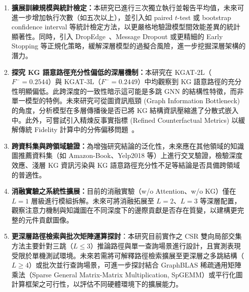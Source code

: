 \begin{enumerate}[leftmargin=2em]
  \item \textbf{擴展訓練規模與統計檢定：}本研究已進行三次獨立執行並報告平均值，未來可進一步增加執行次數（如五次以上），並引入如 paired $t$-test 或 bootstrap confidence interval 等統計檢定方法，以更嚴格地驗證模型間效能差異的統計顯著性。同時，引入 DropEdge~\cite{rong2020dropedge}、Message Dropout 或更精細的 Early Stopping 等正規化策略，緩解深層模型的過擬合風險，進一步挖掘深層架構的潛力。

  \item \textbf{探究 KG 語意路徑充分性偏低的深層機制：}本研究在 KGAT-2L（$F^- = 0.2544$）與 KGAT-3L（$F^- = 0.2449$）中均觀察到 KG 語意路徑的充分性明顯偏低。此跨深度的一致性暗示這可能是多跳 GNN 的結構性特徵，而非單一模型的特例。未來研究可從圖資訊瓶頸 (Graph Information Bottleneck)~\cite{wu2020gib} 的角度，分析模型在多層傳播後是否已將 KG 結構資訊壓縮進了分散式嵌入中。此外，可嘗試引入精煉反事實指標 (Refined Counterfactual Metrics) 以緩解傳統 Fidelity 計算中的分佈偏移問題~\cite{agarwal2024fidelity}。

  \item \textbf{跨資料集與跨領域驗證：}為增強研究結論的泛化性，未來應在其他領域的知識圖推薦資料集（如 Amazon-Book、Yelp2018 等）上進行交叉驗證，檢驗深度效應、淺層 KG 資訊污染與 KG 語意路徑充分性不足等結論是否具備跨領域的普適性。

  \item \textbf{消融實驗之系統性擴展：}目前的消融實驗（w/o Attention、w/o KG）僅在 $L{=}1$ 層級進行模組拆解。未來可將消融拓展至 $L{=}2$、$L{=}3$ 等深層配置，觀察注意力機制與知識圖在不同深度下的邊際貢獻是否存在質變，以建構更完整的元件貢獻圖像。

  \item \textbf{更深層路徑檢索與批次矩陣運算探討}：本研究目前實作之 CSR 雙向局部交集方法主要針對三跳（$L \le 3$）推論路徑與單一查詢場景進行設計，且實測表現受限於單機測試環境。未來若需將可解釋路徑檢索擴展至更深層之多跳結構（$L \ge 4$）或批次並行查詢場景，可進一步探討結合 GraphBLAS 稀疏通用矩陣乘法（Sparse General Matrix-Matrix Multiplication, SpGEMM）或平行化圖計算框架之可行性，以評估不同硬體環境下的擴展能力。
\end{enumerate}

